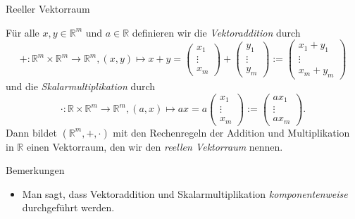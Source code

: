 \documentclass[
  8pt,
  ignorenonframetext,
]{beamer}
\providecommand{\tightlist}{%
  \setlength{\itemsep}{0pt}\setlength{\parskip}{0pt}}
\begin{document}
\begin{frame}{Reeller Vektorraum}
\protect\hypertarget{reeller-vektorraum-2}{}
\vspace{3mm}
\small
{}
\justifying

\begin{definition}
\footnotesize
\justifying
Für alle $x,y \in \mathbb{R}^m$ und $a \in \mathbb{R}$ definieren wir die \textit{Vektoraddition} durch 
\begin{equation}
+ : \mathbb{R}^m  \times \mathbb{R}^m \to \mathbb{R}^m, (x,y) \mapsto x+y = 
\begin{pmatrix}
x_1 \\ \vdots \\ x_m
\end{pmatrix} + 
\begin{pmatrix}
y_1 \\ \vdots \\ y_m
\end{pmatrix} :=
\begin{pmatrix}
x_1 + y_1 \\ \vdots \\ x_m + y_m
\end{pmatrix}
\end{equation}
und die \textit{Skalarmultiplikation} durch
\begin{equation}
\cdot : \mathbb{R} \times \mathbb{R}^m \to \mathbb{R}^m, (a,x) \mapsto ax = a
\begin{pmatrix}
x_1 \\ \vdots \\ x_m
\end{pmatrix} :=
\begin{pmatrix}
ax_1 \\ \vdots \\ ax_m
\end{pmatrix}.
\end{equation}
Dann bildet $(\mathbb{R}^m, +, \cdot)$ mit den Rechenregeln der Addition und Multiplikation in $\mathbb{R}$ einen Vektorraum, den wir den \textit{reellen Vektorraum} nennen.
\end{definition}

Bemerkungen

\begin{itemize}
\tightlist
\item
  Man sagt, dass Vektoraddition und Skalarmultiplikation
  \emph{komponentenweise} durchgeführt werden.
\end{itemize}
\end{frame}
\end{document}
